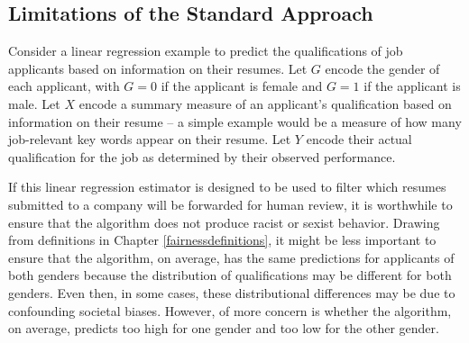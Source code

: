 \documentclass[12pt, twoside]{amherstthesis}
\begin{document}
\hypertarget{standardlimitations}{%
\subsection{Limitations of the Standard Approach}\label{standardlimitations}}

Consider a linear regression example to predict the qualifications of job applicants based on information on their resumes. Let \(G\) encode the gender of each applicant, with \(G=0\) if the applicant is female and \(G=1\) if the applicant is male. Let \(X\) encode a summary measure of an applicant's qualification based on information on their resume -- a simple example would be a measure of how many job-relevant key words appear on their resume. Let \(Y\) encode their actual qualification for the job as determined by their observed performance.

If this linear regression estimator is designed to be used to filter which resumes submitted to a company will be forwarded for human review, it is worthwhile to ensure that the algorithm does not produce racist or sexist behavior. Drawing from definitions in Chapter \ref{fairnessdefinitions}, it might be less important to ensure that the algorithm, on average, has the same predictions for applicants of both genders because the distribution of qualifications may be different for both genders. Even then, in some cases, these distributional differences may be due to confounding societal biases. However, of more concern is whether the algorithm, on average, predicts too high for one gender and too low for the other gender.
\end{document}
